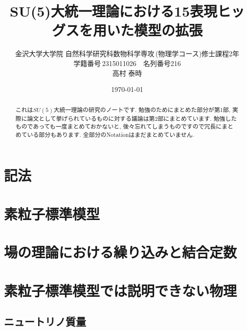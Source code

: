 \documentclass[uplatex,dvipdfmx,a4paper,titlepage]{jsreport}
\theoremstyle{plain}
\theoremstyle{definition}
\begin{document}
\title{SU(5)大統一理論における15表現ヒッグスを用いた模型の拡張}
\author{金沢大学大学院\,\,自然科学研究科数物科学専攻\,(物理学コース)修士課程2年\\学籍番号\,2315011026$\quad$名列番号216\\高村 泰時} 
\date{\today}
\maketitle

\tableofcontents
\clearpage

\begin{abstract}
  これは$SU(5)$大統一理論の研究のノートです.
  勉強のためにまとめた部分が第1部, 実際に論文として挙げられているものに対する議論は第2部にまとめています.
  勉強したものであっても一度まとめておかないと, 後々忘れてしまうものですので冗長にまとめている部分もあります.
  全部分のNotationはまだまとめていません.
\end{abstract}


\chapter{記法}


\chapter{素粒子標準模型}


\chapter{場の理論における繰り込みと結合定数}


\chapter{素粒子標準模型では説明できない物理}


\section{ニュートリノ質量}

\end{document}
